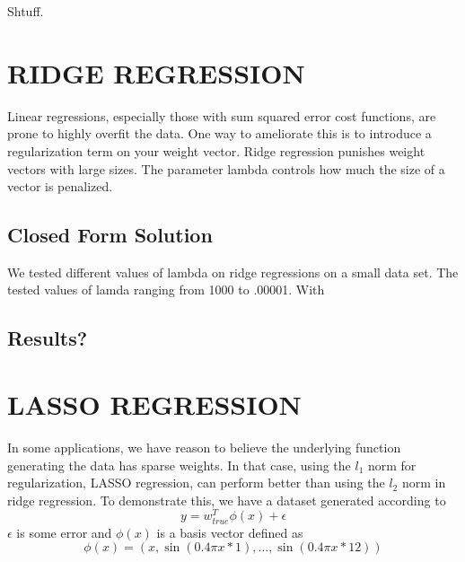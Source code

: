 \documentclass[a4paper,twoside]{article}
\begin{document}
Shtuff.


\section{\uppercase{Ridge Regression}}

Linear regressions, especially those with sum squared error cost functions, are prone to highly overfit the data. One way to ameliorate this is to introduce a regularization term on your weight vector. Ridge regression punishes weight vectors with large sizes. The parameter lambda controls how much the size of a vector is penalized. 

\subsection{Closed Form Solution}

We tested different values of lambda on ridge regressions on a small data set. The tested values of lamda ranging from 1000 to .00001. With 

\subsection{Results?}


\section{\uppercase{LASSO Regression}}
In some applications, we have reason to believe the underlying function generating the data has sparse weights. In that case, using the $l_1$ norm for regularization, LASSO regression, can perform better than using the $l_2$ norm in ridge regression. To demonstrate this, we have a dataset generated according to 
\begin{equation}
y = w_{true}^T \phi (x) + \epsilon
\end{equation}
$\epsilon$ is some error and $\phi (x)$ is a basis vector defined as 
\begin{equation}
\phi(x) = (x, \sin(0.4 \pi x * 1), ..., \sin(0.4 \pi x * 12))
\end{equation}
\end{document}
